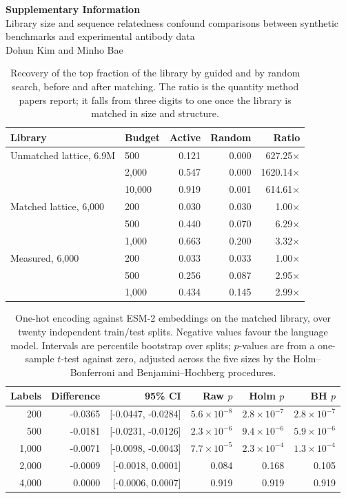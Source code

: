 \documentclass[11pt,a4paper]{article}
\begin{document}
\begin{center}
{\large\bfseries Supplementary Information}\\[4pt]
Library size and sequence relatedness confound comparisons between synthetic
benchmarks and experimental antibody data\\[2pt]
Dohun Kim and Minho Bae
\end{center}
\vspace{1em}
\begin{table}[h]
\caption{Recovery of the top fraction of the library by guided and by random
search, before and after matching. The ratio is the quantity method papers
report; it falls from three digits to one once the library is matched in size
and structure.}
\centering
\begin{tabular}{@{}llrrr@{}}
\toprule
Library & Budget & Active & Random & Ratio \\
\midrule
Unmatched lattice, 6.9M & 500 & 0.121 & 0.000 & 627.25$\times$ \\
 & 2,000 & 0.547 & 0.000 & 1620.14$\times$ \\
 & 10,000 & 0.919 & 0.001 & 614.61$\times$ \\
Matched lattice, 6,000 & 200 & 0.030 & 0.030 & 1.00$\times$ \\
 & 500 & 0.440 & 0.070 & 6.29$\times$ \\
 & 1,000 & 0.663 & 0.200 & 3.32$\times$ \\
Measured, 6,000 & 200 & 0.033 & 0.033 & 1.00$\times$ \\
 & 500 & 0.256 & 0.087 & 2.95$\times$ \\
 & 1,000 & 0.434 & 0.145 & 2.99$\times$ \\
\bottomrule
\end{tabular}
\end{table}
\begin{table}[h]
\caption{One-hot encoding against ESM-2 embeddings on the matched library, over
twenty independent train/test splits. Negative values favour the language
model. Intervals are percentile bootstrap over splits; $p$-values are from a
one-sample $t$-test against zero, adjusted across the five sizes by the
Holm--Bonferroni and Benjamini--Hochberg procedures.}
\centering
\begin{tabular}{@{}rrrrrr@{}}
\toprule
Labels & Difference & 95\% CI & Raw $p$ & Holm $p$ & BH $p$ \\
\midrule
200 & -0.0365 & [-0.0447, -0.0284] & $5.6\times 10^{-8}$ & $2.8\times 10^{-7}$ & $2.8\times 10^{-7}$ \\
500 & -0.0181 & [-0.0231, -0.0126] & $2.3\times 10^{-6}$ & $9.4\times 10^{-6}$ & $5.9\times 10^{-6}$ \\
1,000 & -0.0071 & [-0.0098, -0.0043] & $7.7\times 10^{-5}$ & $2.3\times 10^{-4}$ & $1.3\times 10^{-4}$ \\
2,000 & -0.0009 & [-0.0018, 0.0001] & 0.084 & 0.168 & 0.105 \\
4,000 & 0.0000 & [-0.0006, 0.0007] & 0.919 & 0.919 & 0.919 \\
\bottomrule
\end{tabular}
\end{table}
\end{document}
